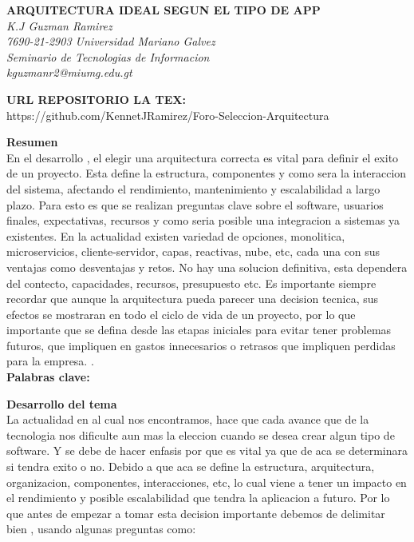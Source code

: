 \documentclass[12pt]{article}
\begin{document}
\begin{center}
    {\bfseries\uppercase{arquitectura ideal segun el tipo de app}} \\
    {\itshape K.J Guzman Ramirez}\\
    {\itshape 7690-21-2903 Universidad Mariano Galvez} \\
    {\itshape Seminario de Tecnologias de Informacion} \\
    {\itshape kguzmanr2@miumg.edu.gt} \\
\end{center}

\textbf{URL REPOSITORIO LA TEX: } \\
https://github.com/KennetJRamirez/Foro-Seleccion-Arquitectura

\vspace{1em}
\noindent\textbf{Resumen}\\
En el desarrollo , el elegir una arquitectura correcta es vital para definir el exito de un proyecto. Esta define la estructura, componentes y como sera la interaccion del sistema, afectando el rendimiento, mantenimiento y escalabilidad a largo plazo. Para esto es que se realizan preguntas clave sobre el software, usuarios finales, expectativas, recursos y como seria posible una integracion a sistemas ya existentes. En la actualidad existen variedad de opciones, monolitica, microservicios, cliente-servidor, capas, reactivas, nube, etc, cada una con sus ventajas como desventajas y retos. No hay una solucion definitiva, esta dependera del contecto, capacidades, recursos, presupuesto etc. Es importante siempre recordar que aunque la arquitectura pueda parecer una decision tecnica, sus efectos se mostraran en todo el ciclo de vida de un proyecto, por lo que importante que se defina desde las etapas iniciales para evitar tener problemas futuros, que impliquen en gastos innecesarios o retrasos que impliquen perdidas para la empresa.
. \\

\noindent\textbf{Palabras clave: } 

\vspace{1em}
\noindent\textbf{Desarrollo del tema} \\
La actualidad en al cual nos encontramos, hace que cada avance que de la tecnologia nos dificulte aun mas la eleccion cuando se desea crear algun tipo de software. Y se debe de hacer enfasis por que es vital ya que de aca se determinara si tendra exito o no. Debido a que  aca se define la estructura, arquitectura, organizacion, componentes, interacciones, etc, lo cual viene a tener un impacto en el rendimiento y posible escalabilidad que tendra la aplicacion a futuro. Por lo que antes de empezar a tomar esta decision importante debemos de delimitar bien , usando algunas preguntas como:
\end{document}
